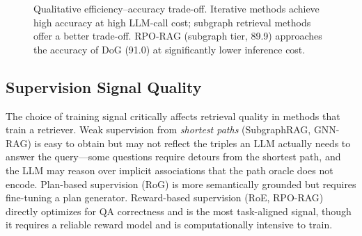 \documentclass[11pt]{article}
\begin{document}
\begin{figure}[t]
\centering
{}
\caption{Qualitative efficiency--accuracy trade-off. Iterative methods achieve high accuracy at high LLM-call cost; subgraph retrieval methods offer a better trade-off. RPO-RAG (subgraph tier, 89.9) approaches the accuracy of DoG (91.0) at significantly lower inference cost.}
\label{fig:efficiency}
\end{figure}

\subsection{Supervision Signal Quality}

The choice of training signal critically affects retrieval quality in methods that train a retriever. Weak supervision from \emph{shortest paths} (SubgraphRAG, GNN-RAG) is easy to obtain but may not reflect the triples an LLM actually needs to answer the query—some questions require detours from the shortest path, and the LLM may reason over implicit associations that the path oracle does not encode. Plan-based supervision (RoG) is more semantically grounded but requires fine-tuning a plan generator. Reward-based supervision (RoE, RPO-RAG) directly optimizes for QA correctness and is the most task-aligned signal, though it requires a reliable reward model and is computationally intensive to train.
\end{document}
